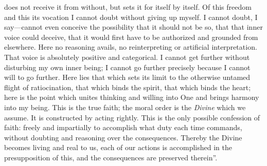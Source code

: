 \documentclass[12pt,a4paper,openany]{book}
\newcommand{\opage}[1]{\marginnote{\footnotesize\textit{[#1]}}}
\begin{document}
does not receive it from without, but sets it for itself
by itself. Of this freedom and this its vocation
I cannot doubt without giving up myself. I cannot
doubt, I say---cannot even conceive the possibility
that it should not be so, that that
inner voice could deceive, that it would first have to be authorized
and grounded from elsewhere. Here no
reasoning avails, no reinterpreting or artificial interpretation.
\setcounter{footnote}{0}%
\opage{527}That voice is absolutely positive and categorical. I cannot
get further without disturbing my own inner being;
I cannot go further precisely because I cannot
will to go further. Here lies that which sets its limit to the
otherwise untamed flight of ratiocination, that which
binds the spirit, that which binds the heart; here is the point
which unites thinking and willing into One and brings harmony
into my being. This is the true faith; the moral
order is the \emph{Divine} which we assume.
It is constructed by acting rightly. This is the only
possible confession of faith: freely and impartially to accomplish
what duty each time commands, without doubting and reasoning
over the consequences. Thereby the Divine becomes
living and real to us, each of our actions is accomplished
in the presupposition of this, and the consequences are preserved therein''.
\end{document}
